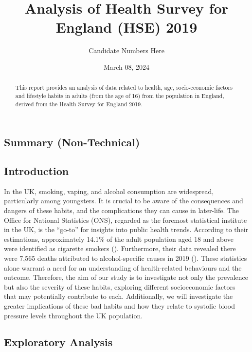 \documentclass[
  11pt,
]{article}
\title{Analysis of Health Survey for England (HSE) 2019}
\author{Candidate Numbers Here}
\date{March 08, 2024}
\begin{document}
\maketitle
\begin{abstract}
This report provides an analysis of data related to health, age,
socio-economic factors and lifestyle habits in adults (from the age of
16) from the population in England, derived from the Health Survey for
England 2019.
\end{abstract}


\newpage

\subsection{Summary (Non-Technical)}\label{summary-non-technical}

\subsection{Introduction}\label{introduction}

In the UK, smoking, vaping, and alcohol consumption are widespread,
particularly among youngsters. It is crucial to be aware of the
consequences and dangers of these habits, and the complications they can
cause in later-life. The Office for National Statistics (ONS), regarded
as the foremost statistical institute in the UK, is the ``go-to'' for
insights into public health trends. According to their estimations,
approximately 14.1\% of the adult population aged 18 and above were
identified as cigarette smokers ().
Furthermore, their data revealed there were 7,565 deaths attributed to
alcohol-specific causes in 2019 (). These
statistics alone warrant a need for an understanding of health-related
behaviours and the outcome. Therefore, the aim of our study is to
investigate not only the prevalence but also the severity of these
habits, exploring different socioeconomic factors that may potentially
contribute to each. Additionally, we will investigate the greater
implications of these bad habits and how they relate to systolic blood
pressure levels throughout the UK population.

\subsection{Exploratory Analysis}\label{exploratory-analysis}
\end{document}
